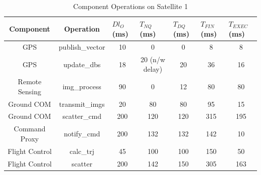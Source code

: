
\begin{table}[t]
  \small
	\caption{Component Operations on Satellite 1}
	\label{table:AR}
	\begin{center}
		\begin{tabular}{ | c | p{2.0cm} | p{1.7cm} | p{1.7cm} | p{1.7cm} | p{1.9cm} | p{1.9cm} |}
			\hline
			Component & \multicolumn{1}{|c|}{Operation} & $Dl_{O}$ (ms) & $T_{NQ}$ (ms) & $T_{DQ}$ (ms) & $T_{FIN}$ (ms) & $T_{EXEC}$ (ms) \\ \hline
			GPS & \multicolumn{1}{|c|}{publish\_vector} & \multicolumn{1}{|c|}{10} & \multicolumn{1}{|c|}{0} & \multicolumn{1}{|c|}{0} & \multicolumn{1}{|c|}{8} & \multicolumn{1}{|c|}{8} \\ \hline
			GPS & \multicolumn{1}{|c|}{update\_dbs} & \multicolumn{1}{|c|}{18} & \multicolumn{1}{|c|}{20 (n/w delay)} & \multicolumn{1}{|c|}{20} & \multicolumn{1}{|c|}{36} & \multicolumn{1}{|c|}{16} \\ \hline
			Remote Sensing & \multicolumn{1}{|c|}{img\_process} & \multicolumn{1}{|c|}{90} & \multicolumn{1}{|c|}{0} & \multicolumn{1}{|c|}{12} & \multicolumn{1}{|c|}{80} & \multicolumn{1}{|c|}{80} \\ \hline
			Ground COM & \multicolumn{1}{|c|}{transmit\_imgs} & \multicolumn{1}{|c|}{20} & \multicolumn{1}{|c|}{80} & \multicolumn{1}{|c|}{80} & \multicolumn{1}{|c|}{95} & \multicolumn{1}{|c|}{15} \\ \hline
			Ground COM & \multicolumn{1}{|c|}{scatter\_cmd} & \multicolumn{1}{|c|}{200} & \multicolumn{1}{|c|}{120} & \multicolumn{1}{|c|}{120} & \multicolumn{1}{|c|}{315} & \multicolumn{1}{|c|}{195} \\ \hline
			Command Proxy & \multicolumn{1}{|c|}{notify\_cmd} & \multicolumn{1}{|c|}{200} & \multicolumn{1}{|c|}{132} & \multicolumn{1}{|c|}{132} & \multicolumn{1}{|c|}{142} & \multicolumn{1}{|c|}{10} \\ \hline
			Flight Control & \multicolumn{1}{|c|}{calc\_trj} & \multicolumn{1}{|c|}{45} & \multicolumn{1}{|c|}{100} & \multicolumn{1}{|c|}{100} & \multicolumn{1}{|c|}{150} & \multicolumn{1}{|c|}{50} \\ \hline
			Flight Control & \multicolumn{1}{|c|}{scatter} & \multicolumn{1}{|c|}{200} & \multicolumn{1}{|c|}{142} & \multicolumn{1}{|c|}{150} & \multicolumn{1}{|c|}{305} & \multicolumn{1}{|c|}{163} \\ \hline
			
			
		\end{tabular}
	\end{center}
	\vspace{-0.2in}
\end{table}

